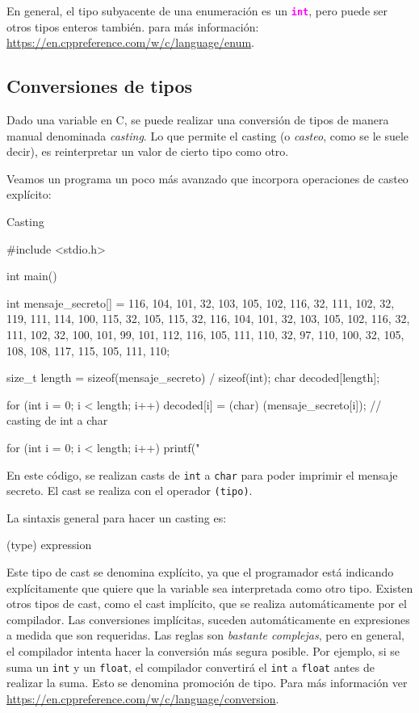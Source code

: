\documentclass[]{scrartcl}
\newcommand{\hl}[1]{\textcolor{magenta}{\textbf{\texttt{#1}}}}
\begin{document}
En general, el tipo subyacente de una enumeración es un \hl{int}, pero puede ser otros tipos enteros también. para más información: \url{https://en.cppreference.com/w/c/language/enum}. 

\subsection*{Conversiones de tipos}
Dado una variable en C, se puede realizar una conversión de tipos de manera manual denominada \textit{casting}. Lo que permite el casting (o \textit{casteo}, como se le suele decir), es reinterpretar un valor de cierto tipo como otro.

Veamos un programa un poco más avanzado que incorpora operaciones de casteo explícito:
\begin{cbox}[]{Casting}

  #include <stdio.h>
 
  int main() {
    int mensaje_secreto[] = {116, 104, 101, 32, 103, 105, 102, 116, 32, 111, 
    102, 32, 119, 111, 114, 100, 115, 32, 105, 115, 32, 116, 104, 101, 32, 
    103, 105, 102, 116, 32, 111, 102, 32, 100, 101, 99, 101, 112, 116, 105, 
    111, 110, 32, 97, 110, 100, 32, 105, 108, 108, 117, 115, 105, 111, 110};

    size_t length = sizeof(mensaje_secreto) / sizeof(int);
    char decoded[length];
    
    for (int i = 0; i < length; i++) {
      decoded[i] = (char) (mensaje_secreto[i]); // casting de int a char
    }
  
    for (int i = 0; i < length; i++) {
      printf("%
    }
  }

\end{cbox}

En este código, se realizan casts de \texttt{int} a \texttt{char} para poder imprimir el mensaje secreto. El cast se realiza con el operador \texttt{(tipo)}. 

La sintaxis general para hacer un casting es:

\begin{bashbox}[]
  (type) expression
\end{bashbox}

Este tipo de cast se denomina explícito, ya que el programador está indicando explícitamente que quiere que la variable sea interpretada como otro tipo. Existen otros tipos de cast, como el cast implícito, que se realiza automáticamente por el compilador. Las conversiones implícitas, suceden automáticamente en expresiones a medida que son requeridas. Las reglas son \textit{bastante complejas}, pero en general, el compilador intenta hacer la conversión más segura posible. Por ejemplo, si se suma un \texttt{int} y un \texttt{float}, el compilador convertirá el \texttt{int} a \texttt{float} antes de realizar la suma. Esto se denomina promoción de tipo. Para más información ver \url{https://en.cppreference.com/w/c/language/conversion}.
\end{document}
